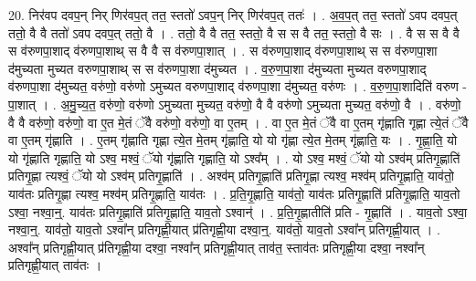 \documentclass[17pt]{extarticle}
\begin{document}
20. निर॑वप दवप॒न् निर् णिर॑वप॒त् तत॒ स्ततो॑ ऽवप॒न् निर् णिर॑वप॒त् ततः॑ । . अ॒व॒प॒त् तत॒ स्ततो॑ ऽवप दवप॒त् ततो॒ वै वै ततो॑ ऽवप दवप॒त् ततो॒ वै । . ततो॒ वै वै तत॒ स्ततो॒ वै स स वै तत॒ स्ततो॒ वै सः । . वै स स वै वै स व॑रुणपा॒शाद् व॑रुणपा॒शाथ् स वै वै स व॑रुणपा॒शात् । . स व॑रुणपा॒शाद् व॑रुणपा॒शाथ् स स व॑रुणपा॒शा द॑मुच्यता मुच्यत वरुणपा॒शाथ् स स व॑रुणपा॒शा द॑मुच्यत । . व॒रु॒ण॒पा॒शा द॑मुच्यता मुच्यत वरुणपा॒शाद् व॑रुणपा॒शा द॑मुच्यत॒ वरु॑णो॒ वरु॑णो ऽमुच्यत वरुणपा॒शाद् व॑रुणपा॒शा द॑मुच्यत॒ वरु॑णः । . व॒रु॒ण॒पा॒शादिति॑ वरुण - पा॒शात् । . अ॒मु॒च्य॒त॒ वरु॑णो॒ वरु॑णो ऽमुच्यता मुच्यत॒ वरु॑णो॒ वै वै वरु॑णो ऽमुच्यता मुच्यत॒ वरु॑णो॒ वै । . वरु॑णो॒ वै वै वरु॑णो॒ वरु॑णो॒ वा ए॒त मे॒तं ॅवै वरु॑णो॒ वरु॑णो॒ वा ए॒तम् । . वा ए॒त मे॒तं ॅवै वा ए॒तम् गृ॑ह्णाति गृह्णा त्ये॒तं ॅवै वा ए॒तम् गृ॑ह्णाति । . ए॒तम् गृ॑ह्णाति गृह्णा त्ये॒त मे॒तम् गृ॑ह्णाति॒ यो यो गृ॑ह्णा त्ये॒त मे॒तम् गृ॑ह्णाति॒ यः । . गृ॒ह्णा॒ति॒ यो यो गृ॑ह्णाति गृह्णाति॒ यो ऽश्व॒ मश्वं॒ ॅयो गृ॑ह्णाति गृह्णाति॒ यो ऽश्व᳚म् । . यो ऽश्व॒ मश्वं॒ ॅयो यो ऽश्व॑म् प्रतिगृ॒ह्णाति॑ प्रतिगृ॒ह्णा त्यश्वं॒ ॅयो यो ऽश्व॑म् प्रतिगृ॒ह्णाति॑ । . अश्व॑म् प्रतिगृ॒ह्णाति॑ प्रतिगृ॒ह्णा त्यश्व॒ मश्व॑म् प्रतिगृ॒ह्णाति॒ याव॑तो॒ याव॑तः प्रतिगृ॒ह्णा त्यश्व॒ मश्व॑म् प्रतिगृ॒ह्णाति॒ याव॑तः । . प्र॒ति॒गृ॒ह्णाति॒ याव॑तो॒ याव॑तः प्रतिगृ॒ह्णाति॑ प्रतिगृ॒ह्णाति॒ याव॒तो ऽश्वा॒ नश्वा॒न्॒. याव॑तः प्रतिगृ॒ह्णाति॑ प्रतिगृ॒ह्णाति॒ याव॒तो ऽश्वान्॑ । . प्र॒ति॒गृ॒ह्णातीति॑ प्रति - गृ॒ह्णाति॑ । . याव॒तो ऽश्वा॒ नश्वा॒न्॒. याव॑तो॒ याव॒तो ऽश्वा᳚न् प्रतिगृह्णी॒यात् प्र॑तिगृह्णी॒या दश्वा॒न्॒. याव॑तो॒ याव॒तो ऽश्वा᳚न् प्रतिगृह्णी॒यात् । . अश्वा᳚न् प्रतिगृह्णी॒यात् प्र॑तिगृह्णी॒या दश्वा॒ नश्वा᳚न् प्रतिगृह्णी॒यात् ताव॑त॒ स्ताव॑तः प्रतिगृह्णी॒या दश्वा॒ 
नश्वा᳚न् प्रतिगृह्णी॒यात् ताव॑तः । \newline
\end{document}
